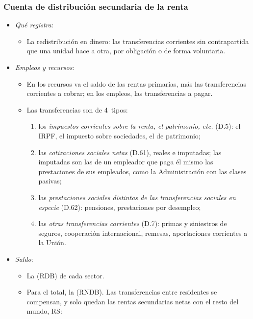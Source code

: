 \documentclass[11pt]{article}
\begin{document}
\subsubsection{Cuenta de distribución secundaria de la renta}\label{sec:distribucion}

\begin{itemize}
\item \emph{Qué registra}:
  \begin{itemize}
  \item La redistribución en dinero: las transferencias corrientes sin contrapartida que una unidad hace a otra, por obligación o de forma voluntaria.
  \end{itemize}
\item \emph{Empleos y recursos}:
  \begin{itemize}
  \item En los recursos va el saldo de las rentas primarias, más las transferencias corrientes a cobrar; en los empleos, las transferencias a pagar.
  \item Las transferencias son de 4~tipos:
    \begin{enumerate}
    \item los \emph{impuestos corrientes sobre la renta, el patrimonio, etc.} (D.5): el IRPF, el impuesto sobre sociedades, el de patrimonio;
    \item las \emph{cotizaciones sociales netas} (D.61), reales e imputadas; las imputadas son las de un empleador que paga él mismo las prestaciones de sus empleados, como la Administración con las clases pasivas;
    \item las \emph{prestaciones sociales distintas de las transferencias sociales en especie} (D.62): pensiones, prestaciones por desempleo;
    \item las \emph{otras transferencias corrientes} (D.7): primas y siniestros de seguros, cooperación internacional, remesas, aportaciones corrientes a la Unión.
    \end{enumerate}
  \end{itemize}
\item \emph{Saldo}:
  \begin{itemize}
  \item La  (RDB) de cada sector.
  \item Para el total, la  (RNDB). Las transferencias entre residentes se compensan, y solo quedan las rentas secundarias netas con el resto del mundo, $\mathrm{RS}$:
\begin{equation}\label{eq:rndb}

\end{equation}
\end{itemize}
\end{itemize}
\end{document}
